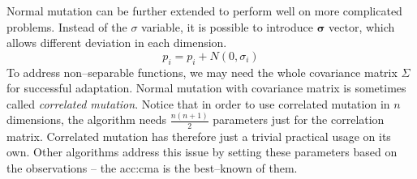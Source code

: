 Normal mutation can be further extended to perform well on more complicated problems. Instead of the $\sigma$ variable, it is possible to introduce $\boldsymbol{\sigma}$ vector, which allows different deviation in each dimension.
$$
p_i = p_i + N(0,\sigma_i)
$$ 
To address non--separable functions, we may need the whole covariance matrix $\Sigma$ for successful adaptation. Normal mutation with covariance matrix is sometimes called \emph{correlated mutation}. Notice that in order to use correlated mutation in $n$ dimensions, the algorithm needs $\frac{n\left(n+1\right)}{2}$ parameters just for the correlation matrix. Correlated mutation has therefore just a trivial practical usage on its own. Other algorithms address this issue by setting these parameters based on the observations -- the \acrfull{acc:cma} is the best--known of them.

